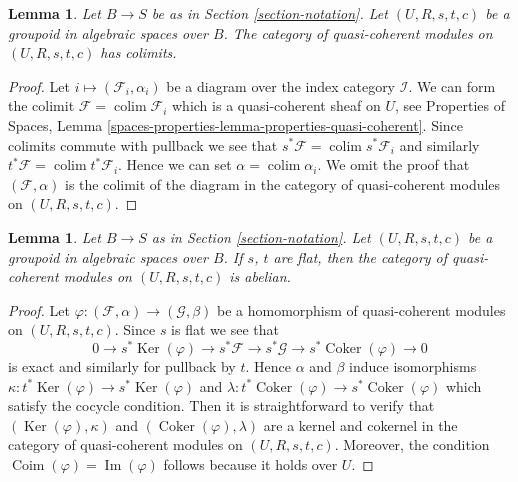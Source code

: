 \documentclass{stacks-project}
\theoremstyle{plain}
\newtheorem{lemma}[subsection]{Lemma}
\theoremstyle{definition}
\theoremstyle{remark}
\numberwithin{equation}{subsection}
\def\colim{\mathop{\mathrm{colim}}\nolimits}
\def\Ker{\mathop{\mathrm{Ker}}}
\def\Im{\mathop{\mathrm{Im}}}
\def\Coker{\mathop{\mathrm{Coker}}}
\def\Coim{\mathop{\mathrm{Coim}}}
\begin{document}
\begin{lemma}
\label{lemma-colimits}
Let $B \to S$ be as in Section \ref{section-notation}.
Let $(U, R, s, t, c)$ be a groupoid in algebraic spaces over $B$.
The category of quasi-coherent modules on $(U, R, s, t, c)$ has colimits.
\end{lemma}

\begin{proof}
Let $i \mapsto (\mathcal{F}_i, \alpha_i)$ be a diagram over the index
category $\mathcal{I}$. We can form the colimit
$\mathcal{F} = \colim \mathcal{F}_i$
which is a quasi-coherent sheaf on $U$, see
Properties of Spaces, Lemma
\ref{spaces-properties-lemma-properties-quasi-coherent}.
Since colimits commute with pullback we see that
$s^*\mathcal{F} = \colim s^*\mathcal{F}_i$ and similarly
$t^*\mathcal{F} = \colim t^*\mathcal{F}_i$. Hence we can set
$\alpha = \colim \alpha_i$. We omit the proof that $(\mathcal{F}, \alpha)$
is the colimit of the diagram in the category of quasi-coherent modules
on $(U, R, s, t, c)$.
\end{proof}

\begin{lemma}
\label{lemma-abelian}
Let $B \to S$ as in Section \ref{section-notation}.
Let $(U, R, s, t, c)$ be a groupoid in algebraic spaces over $B$.
If $s$, $t$ are flat, then the category of quasi-coherent modules on
$(U, R, s, t, c)$ is abelian.
\end{lemma}

\begin{proof}
Let $\varphi : (\mathcal{F}, \alpha) \to (\mathcal{G}, \beta)$ be a
homomorphism of quasi-coherent modules on $(U, R, s, t, c)$. Since $s$ is flat
we see that
$$
0 \to s^*\Ker(\varphi)
\to s^*\mathcal{F} \to s^*\mathcal{G} \to s^*\Coker(\varphi) \to 0
$$
is exact and similarly for pullback by $t$. Hence $\alpha$ and $\beta$
induce isomorphisms
$\kappa : t^*\Ker(\varphi) \to s^*\Ker(\varphi)$ and
$\lambda : t^*\Coker(\varphi) \to s^*\Coker(\varphi)$
which satisfy the cocycle condition. Then it is straightforward to
verify that $(\Ker(\varphi), \kappa)$ and
$(\Coker(\varphi), \lambda)$ are a kernel and cokernel in the
category of quasi-coherent modules on $(U, R, s, t, c)$. Moreover,
the condition $\Coim(\varphi) = \Im(\varphi)$ follows
because it holds over $U$.
\end{proof}
\end{document}
